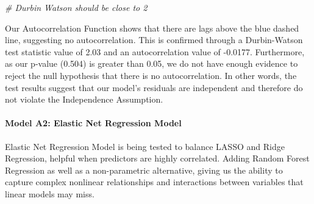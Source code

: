 \documentclass[
]{article}
\newenvironment{Shaded}{\begin{snugshade}}{\end{snugshade}}
\newcommand{\CommentTok}[1]{\textcolor[rgb]{0.56,0.35,0.01}{\textit{#1}}}
\begin{document}
\begin{Shaded}
\begin{Highlighting}[]
\CommentTok{\# Durbin Watson should be close to 2}
\end{Highlighting}
\end{Shaded}

Our Autocorrelation Function shows that there are lags above the blue
dashed line, suggesting no autocorrelation. This is confirmed through a
Durbin-Watson test statistic value of 2.03 and an autocorrelation value
of -0.0177. Furthermore, as our p-value (0.504) is greater than 0.05, we
do not have enough evidence to reject the null hypothesis that there is
no autocorrelation. In other words, the test results suggest that our
model's residuals are independent and therefore do not violate the
Independence Assumption.

\paragraph{Model A2: Elastic Net Regression
Model}\label{model-a2-elastic-net-regression-model}

Elastic Net Regression Model is being tested to balance LASSO and Ridge
Regression, helpful when predictors are highly correlated. Adding Random
Forest Regression as well as a non-parametric alternative, giving us the
ability to capture complex nonlinear relationships and interactions
between variables that linear models may miss.
\end{document}
